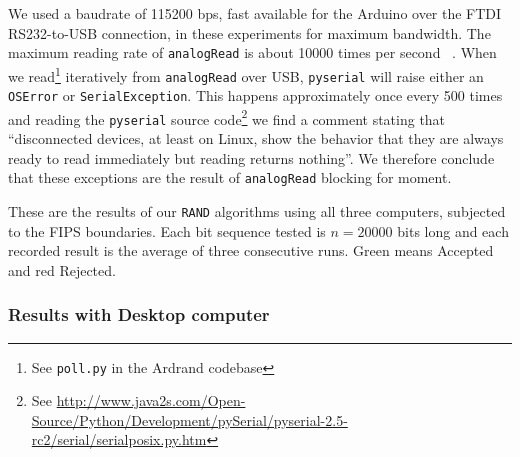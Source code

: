 \documentclass[a4paper]{article}           %
\begin{document}
We used a baudrate of 115200 bps, fast available for the Arduino over the FTDI RS232-to-USB connection, in these experiments for maximum bandwidth. The maximum reading rate of \texttt{analogRead} is about 10000 times per second ~\cite{ardref}. When we read\footnote{See \texttt{poll.py} in the Ardrand codebase} iteratively from \texttt{analogRead} over USB,  \texttt{pyserial} will raise either an \texttt{OSError} or \texttt{SerialException}. This happens approximately once every 500 times and reading the \texttt{pyserial} source code\footnote{See \url{http://www.java2s.com/Open-Source/Python/Development/pySerial/pyserial-2.5-rc2/serial/serialposix.py.htm}} we find a comment stating that ``disconnected devices, at least on Linux, show the behavior that they are always ready to read immediately but reading returns nothing''. We therefore conclude that these exceptions are the result of \texttt{analogRead} blocking for moment. 

These are the results of our \texttt{RAND} algorithms using all three computers, subjected to the FIPS boundaries. Each bit sequence tested is $n = 20000$ bits long and each recorded result is the average of three consecutive runs. Green means Accepted and red Rejected. 

\subsubsection{Results with Desktop computer}
\end{document}

